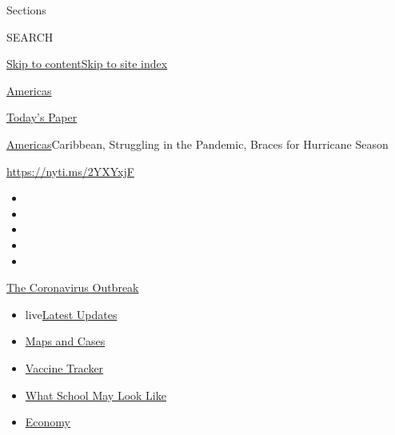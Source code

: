 Sections

SEARCH

\protect\hyperlink{site-content}{Skip to
content}\protect\hyperlink{site-index}{Skip to site index}

\href{https://www.nytimes.com/section/world/americas}{Americas}

\href{https://myaccount.nytimes.com/auth/login?response_type=cookie\&client_id=vi}{}

\href{https://www.nytimes.com/section/todayspaper}{Today's Paper}

\href{/section/world/americas}{Americas}\textbar{}Caribbean, Struggling
in the Pandemic, Braces for Hurricane Season

\url{https://nyti.ms/2YXYxjF}

\begin{itemize}
\item
\item
\item
\item
\item
\end{itemize}

\href{https://www.nytimes.com/news-event/coronavirus?action=click\&pgtype=Article\&state=default\&region=TOP_BANNER\&context=storylines_menu}{The
Coronavirus Outbreak}

\begin{itemize}
\tightlist
\item
  live\href{https://www.nytimes.com/2020/08/01/world/coronavirus-covid-19.html?action=click\&pgtype=Article\&state=default\&region=TOP_BANNER\&context=storylines_menu}{Latest
  Updates}
\item
  \href{https://www.nytimes.com/interactive/2020/us/coronavirus-us-cases.html?action=click\&pgtype=Article\&state=default\&region=TOP_BANNER\&context=storylines_menu}{Maps
  and Cases}
\item
  \href{https://www.nytimes.com/interactive/2020/science/coronavirus-vaccine-tracker.html?action=click\&pgtype=Article\&state=default\&region=TOP_BANNER\&context=storylines_menu}{Vaccine
  Tracker}
\item
  \href{https://www.nytimes.com/interactive/2020/07/29/us/schools-reopening-coronavirus.html?action=click\&pgtype=Article\&state=default\&region=TOP_BANNER\&context=storylines_menu}{What
  School May Look Like}
\item
  \href{https://www.nytimes.com/live/2020/07/31/business/stock-market-today-coronavirus?action=click\&pgtype=Article\&state=default\&region=TOP_BANNER\&context=storylines_menu}{Economy}
\end{itemize}

